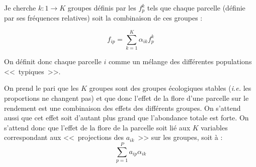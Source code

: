 \documentclass[a4paper, 12pt]{article}
\begin{document}
Je cherche $ k: 1 \to K $ groupes définis par les $ f^{k}_{p} $ tels que chaque
parcelle (définie par ses fréquences relatives) soit la combinaison de ces
groupes :

\[
  f_{ip} = \sum_{k=1}^{K} \alpha _{ik}f_{p}^{k}
\]

On définit donc chaque parcelle $i$ comme un mélange des différentes populations
<<~typiques~>>.

On prend le pari que les $K$ groupes sont des groupes écologiques stables
(\textit{i.e.} les proportions ne changent pas) et que donc l'effet de la flore
d'une parcelle sur le rendement est une combinaison des effets des différents
groupes.
On s'attend aussi que cet effet soit d'autant plus grand que l'abondance totale
est forte.
On s'attend donc que l'effet de la flore de la parcelle soit lié aux $K$
variables correspondant aux <<~projections des $a_{ik}$~>> sur les groupes, soit
à :
\[
  \sum_{p=1}^{P} a_{ip} \alpha _{ik}
\]
\end{document}
